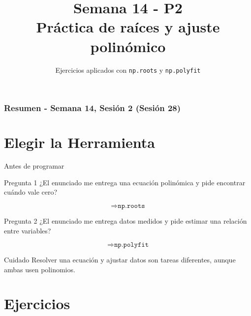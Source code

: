 \documentclass[10pt]{beamer}
\title[Semana 14 - P2]{Semana 14 - P2\\Práctica de raíces y ajuste polinómico}
\subtitle{Ejercicios aplicados con \texttt{np.roots} y \texttt{np.polyfit}}
\begin{document}
\myfront{}

\begin{frame}
  \titlepage
\end{frame}

\begin{frame}
  \frametitle{Resumen - Semana 14, Sesión 2 (Sesión 28)}
  \tableofcontents
\end{frame}


\section{Elegir la Herramienta}

\begin{frame}{Antes de programar}
  \begin{block}{Pregunta 1}
    ¿El enunciado me entrega una ecuación polinómica y pide encontrar cuándo vale cero?

    \[
      \Rightarrow \texttt{np.roots}
    \]
  \end{block}

  \begin{block}{Pregunta 2}
    ¿El enunciado me entrega datos medidos y pide estimar una relación entre variables?

    \[
      \Rightarrow \texttt{np.polyfit}
    \]
  \end{block}

  \begin{alertblock}{Cuidado}
    Resolver una ecuación y ajustar datos son tareas diferentes, aunque ambas usen polinomios.
  \end{alertblock}
\end{frame}

\section{Ejercicios}
\end{document}
